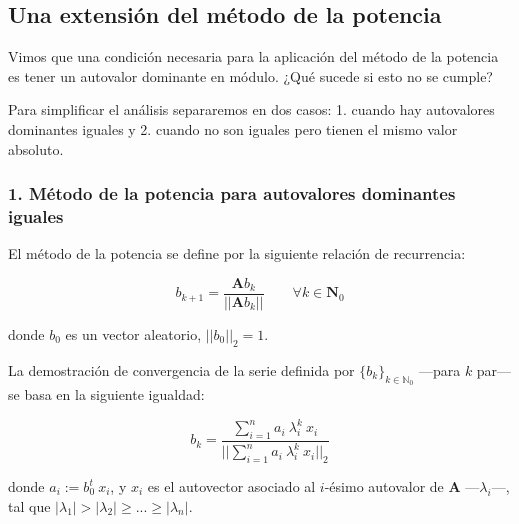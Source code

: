 
\vspace{1em}
\subsection{Una extensión del método de la potencia} \label{ap_A}

Vimos que una condición necesaria para la aplicación del método de la potencia es tener un autovalor dominante en módulo. ¿Qué sucede si esto no se cumple?

\vspace{1em}
\noindent Para simplificar el análisis separaremos en dos casos: 1. cuando hay autovalores dominantes iguales y 2. cuando no son iguales pero tienen el mismo valor absoluto.






\vspace{2em}
\subsubsection*{1. Método de la potencia para autovalores dominantes iguales} El método de la potencia se define por la siguiente relación de recurrencia:

\vspace{1em}
\begin{equation*} 
    b_{k+1} = \frac{\mathbf{A}b_k}{||\mathbf{A}b_k||} \qquad \forall k \in \mathbf{N}_0
\end{equation*}

\vspace{1em}
\noindent donde $b_0$ es un vector aleatorio, $||b_0||_2 = 1$.

\vspace{1em}
\noindent La demostración de convergencia de la serie definida por $\{b_k\}_{k \in \mathbb{N}_0}$ ---para $k$ par--- se basa en la siguiente igualdad: 

\begin{equation} \label{eq_potencia}
    b_k = \frac{\sum_{i=1}^{n} a_i \ \lambda_{i}^{k} \ x_i }{||\sum_{i=1}^{n} a_i \ \lambda_{i}^{k} \ x_i||_2}
\end{equation}

\vspace{1em}
\noindent donde $a_i := b_0^t\ x_i$, y $x_i$ es el autovector asociado al $i$-ésimo autovalor de $\mathbf{A}$ ---$\lambda_i$---, tal que $|\lambda_1| > |\lambda_2| \geq ... \geq |\lambda_n|$.

